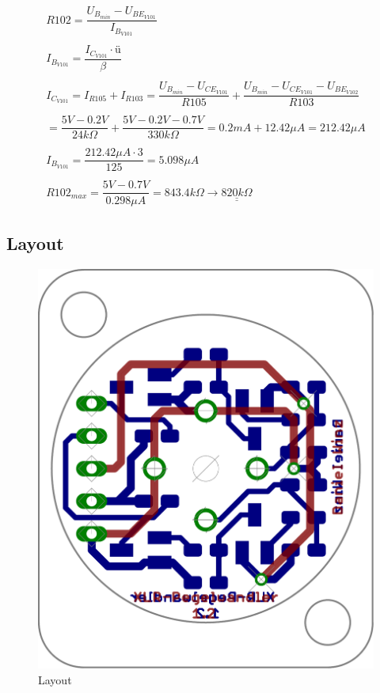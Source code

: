 %
\[ \begin{array}{l}
R102 
= \dfrac{U_{B_{min}} - U_{BE_{V101}}}{I_{B_{V101}}}\\\\
I_{B_{V101}} 
= \dfrac{I_{C_{V101}} \cdot ü}{\beta}\\\\
I_{C_{V101}} 
= I_{R105} + I_{R103} 
= \dfrac{U_{B_{min}} - U_{CE_{V101}}}{R105} + \dfrac{U_{B_{min}} - U_{CE_{V101}} - U_{BE_{V102}}}{R103} \\\\
= \dfrac{5 V - 0.2 V}{24 k \Omega} + \dfrac{5 V - 0.2 V - 0.7 V}{330 k \Omega} 
= 0.2 mA + 12.42 \mu A 
= 212.42 \mu A \\\\
I_{B_{V101}} 
= \dfrac{212.42 \mu A \cdot 3}{125} 
= 5.098 \mu A \\\\
R102_{max} 
= \dfrac{5 V - 0.7 V}{0.298 \mu A} 
= 843.4 k \Omega 
\rightarrow \underline{\underline{820 k \Omega}}
\end{array} \]

\subsection{Layout}
\begin{figure}[h!]
	\centering
	\includegraphics[scale=\layscale]{fig/xlr_pegelwandler_v_1_2_lay_transp.pdf}
	\caption{Layout}
	\label{lay:pegw}
\end{figure}
